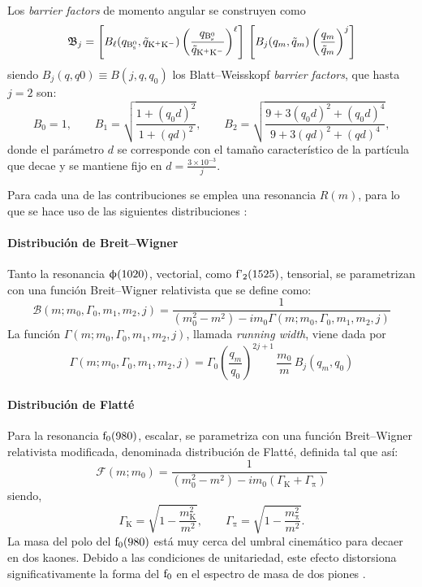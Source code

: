 Los \emph{barrier factors} de momento angular se construyen como \cite{blatt2012theoretical}
\begin{equation}
\mathfrak{B}_j = \left[ B_{\ell}(q_{\text{B}{}_{\text{s}}^{\text{0}}},\tilde{q}_{\text{K}{}^{+}\text{K}{}^{-}}) \left( \frac{q_{\text{B}{}_{\text{s}}^{\text{0}}}}{\tilde{q}_{\text{K}{}^{+}\text{K}{}^{-}}} \right)^{\ell}\right] \, \left[ B_j(q_m,\tilde{q}_m) \left( \frac{q_m}{\tilde{q}_m} \right)^j\right]
\end{equation}
siendo $B_j(q,q0) \equiv B(j,q,q_0)$ los Blatt--Weisskopf \emph{barrier factors}, que hasta $j=2$ son:
\begin{equation} 
B_0 = 1, \qquad B_1 = \sqrt{\frac{1+(q_0d)^2}{1+(qd)^2}}, \qquad B_2 = \sqrt{\frac{9+3(q_0d)^2+(q_0d)^4}{9+3(qd)^2+(qd)^4}},
\end{equation}
donde el parámetro $d$ se corresponde con el tamaño característico de la partícula que decae y se mantiene fijo en $d = \frac{3\times10^{-3}}{j}$.



Para cada una de las contribuciones se emplea una resonancia $R(m)$, para lo que se hace uso de las siguientes distribuciones \cite{paperPhis}:

\paragraph{Distribución de Breit--Wigner}

Tanto la resonancia $\upphi(1020)$, vectorial, como $\text{f'}_2(1525)$, tensorial, se parametrizan con una función Breit--Wigner relativista que se define como: 
\begin{equation}
\mathcal{B}(m;m_0,\Gamma_0,m_1,m_2,j) = \frac{1}{(m_0^2-m^2)-im_0\Gamma(m;m_0,\Gamma_0,m_1,m_2,j)}
\end{equation}
La función $\Gamma(m;m_0,\Gamma_0,m_1,m_2,j)$, llamada \emph{running width}, viene dada por
\begin{equation}
	\Gamma(m;m_0,\Gamma_0,m_1,m_2,j) = \Gamma_0 \left(\frac{q_m}{q_0}\right)^{2j+1}\, \frac{m_0}{m} \, B_j (q_m,q_0)
\end{equation}


\paragraph{Distribución de Flatté}

Para la resonancia $\text{f}_0(980)$, escalar,  se parametriza con una función Breit--Wigner relativista modificada, denominada distribución de Flatté, definida tal que así: 
\begin{equation}
\mathcal{F}(m;m_0) = \frac{1}{(m_0^2-m^2)-im_0(\Gamma_\text{K}+\Gamma_{\uppi})}
\end{equation}
siendo,
\begin{equation}
	\Gamma_{\text{K}} = \sqrt{1-\frac{m_{\text{K}}^2}{m^2}}, \qquad 	\Gamma_{\uppi} = \sqrt{1-\frac{m_{\uppi}^2}{m^2}}.
\end{equation}
La masa del polo del $\text{f}_0(980)$ está muy cerca del umbral cinemático para decaer en dos kaones. Debido a las condiciones de unitariedad, este efecto distorsiona significativamente la forma del $\text{f}_0$ en el espectro de masa de dos piones \cite{baru2005flatte}. 




